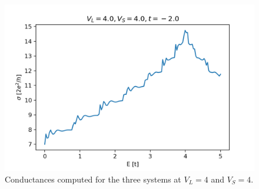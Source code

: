 \documentclass[12pt]{article}
\numberwithin{equation}{section}
\begin{document}
\begin{figure}
\begin{minipage}{0.333\textwidth}
    \includegraphics[width=1.0\textwidth]{./media/cond_2deg_W8_L10_VL4_0_VS4_0.png} %
  \end{minipage}
  \caption{Conductances computed for the three systems at $V_L=4$ and $V_S=4$.}
\end{figure}
\end{document}
